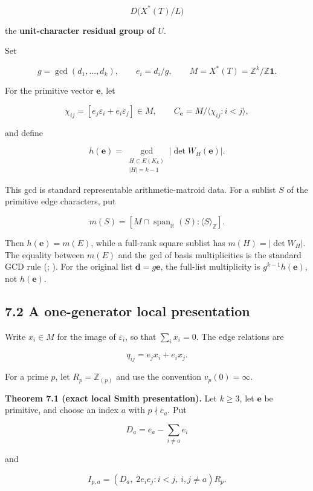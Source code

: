 \documentclass[
  11pt,
  a4paper,
]{article}
\begin{document}
\[
 D\bigl(X^*(T)/L\bigr)
\]

the \textbf{unit-character residual group of \(U\)}.

Set

\[
 g=\gcd(d_1,\ldots,d_k),\qquad e_i=d_i/g,
 \qquad M=X^*(T)=\mathbb Z^k/\mathbb Z\mathbf1.
\]

For the primitive vector \(\mathbf e\), let

\[
 \chi_{ij}=[e_j\varepsilon_i+e_i\varepsilon_j]\in M,
 \qquad C_{\mathbf e}=M/\langle\chi_{ij}:i<j\rangle,
\]

and define

\[
 h(\mathbf e)=
 \gcd_{\substack{H\subset E(K_k)\\|H|=k-1}}
 |\det W_H(\mathbf e)|.
\tag{7.2}
\]

This gcd is standard representable arithmetic-matroid data. For a
sublist \(S\) of the primitive edge characters, put

\[
 m(S)=
 [M\cap\operatorname{span}_{\mathbb R}(S):\langle S\rangle_{\mathbb Z}].
\]

Then \(h(\mathbf e)=m(E)\), while a full-rank square sublist has
\(m(H)=|\det W_H|\). The equality between \(m(E)\) and the gcd of basis
multiplicities is the standard GCD rule (; ). For the original list \(\mathbf d=g\mathbf e\),
the full-list multiplicity is \(g^{k-1}h(\mathbf e)\), not
\(h(\mathbf e)\).

\subsection{7.2 A one-generator local
presentation}\label{a-one-generator-local-presentation}

Write \(x_i\in M\) for the image of \(\varepsilon_i\), so that
\(\sum_i x_i=0\). The edge relations are

\[
 q_{ij}=e_jx_i+e_ix_j.
\]

For a prime \(p\), let \(R_p=\mathbb Z_{(p)}\) and use the convention
\(v_p(0)=\infty\).

\textbf{Theorem 7.1 (exact local Smith presentation).} Let \(k\ge3\),
let \(\mathbf e\) be primitive, and choose an index \(a\) with
\(p\nmid e_a\). Put

\[
 D_a=e_a-\sum_{i\ne a}e_i
\]

and

\[
 I_{p,a}=
 (D_a,\;2e_ie_j:i<j,\ i,j\ne a)R_p.
\]
\end{document}
